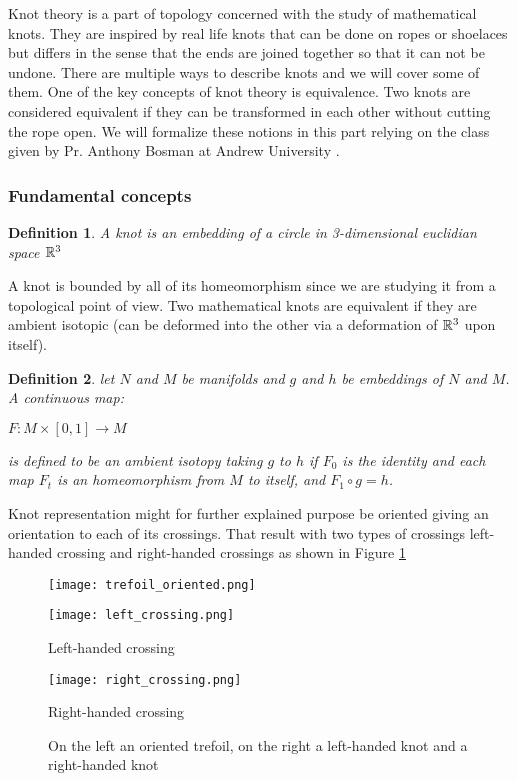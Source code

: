 \documentclass[12pt, a4paper]{article}
\newtheorem{definition}{Definition}
\begin{document}
Knot theory is a part of topology concerned with the study of mathematical knots. They are inspired by real life knots  that can be done on ropes or shoelaces but differs in the sense that the ends are joined together so that it can not be undone. There are multiple ways to describe knots and we will cover some of them. One of the key concepts of knot theory is equivalence. Two knots are considered equivalent if they can be transformed in each other without cutting the rope open. We will formalize these notions in this part relying on the class given by Pr. Anthony Bosman at Andrew University \cite{anthony_bosman_knot_2019}.

\subsubsection{Fundamental concepts}

\begin{definition}
  A knot is an embedding of a circle in 3-dimensional euclidian space $\mathbb{R}^3$
\end{definition}

A knot is bounded by all of its homeomorphism since we are studying it from a topological point of view. Two mathematical knots are equivalent if they are ambient isotopic (can be deformed into the other via a deformation of $\mathbb{R}^3$ upon itself).\\

\begin{definition}
  let $N$ and $M$ be manifolds and $g$ and $h$ be embeddings of $N$ and $M$. A continuous map:
   \begin{center}
     $F: M \times [0,1] \to M$
   \end{center}
  is defined to be an ambient isotopy taking $g$ to $h$ if $F_0$ is the identity and each map $F_t$ is an homeomorphism from $M$ to itself, and $F_1 \circ g = h$.
\end{definition}

  Knot representation might for further explained purpose be oriented giving an orientation to each of its crossings. That result with two types of crossings left-handed crossing and right-handed crossings as shown in Figure \ref{fig:oriented_knot}

\begin{figure}[H]
  \begin{minipage}[c]{.5\textwidth}
  \centering
  \texttt{[image: trefoil\_oriented.png]}    
  \end{minipage}
  \begin{minipage}[c]{.20\textwidth}
  \centering
  \texttt{[image: left\_crossing.png]}    
  \caption{Left-handed crossing}
  \end{minipage}
  \begin{minipage}[c]{.20\textwidth}
  \centering
  \texttt{[image: right\_crossing.png]}    
  \caption{Right-handed crossing}
  \end{minipage}
  \caption{On the left an oriented trefoil, on the right a left-handed knot and a right-handed knot}
  \label{fig:oriented_knot} 
\end{figure}
\end{document}
